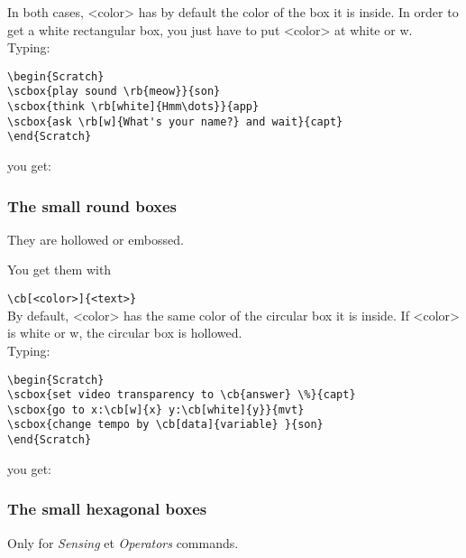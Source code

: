 \documentclass[a4paper,11pt]{article}
\begin{document}
In both cases, <color> has by default the color of the box it is inside. In order to get a white rectangular box, you just have to put <color> at white or w.\\

Typing:
\begin{verbatim}
\begin{Scratch}
\scbox{play sound \rb{meow}}{son}
\scbox{think \rb[white]{Hmm\dots}}{app}
\scbox{ask \rb[w]{What's your name?} and wait}{capt}
\end{Scratch}
\end{verbatim}

you get:\\

\begin{Scratch}
\end{Scratch}

\subsubsection{The small round boxes}%

They are hollowed or embossed.

You get them with

\texttt{\textbackslash cb[<color>]\{<text>\}}\\

By default, <color> has the same color of the circular box it is inside. If <color> is white or w, the circular box is hollowed.\\

Typing:
\begin{verbatim}
\begin{Scratch}
\scbox{set video transparency to \cb{answer} \%}{capt}
\scbox{go to x:\cb[w]{x} y:\cb[white]{y}}{mvt}
\scbox{change tempo by \cb[data]{variable} }{son}
\end{Scratch}
\end{verbatim}

you get:\\

\begin{Scratch}
\end{Scratch}


\subsubsection{The small hexagonal boxes}%
Only for \emph{Sensing} et \emph{Operators} commands.
\end{document}
